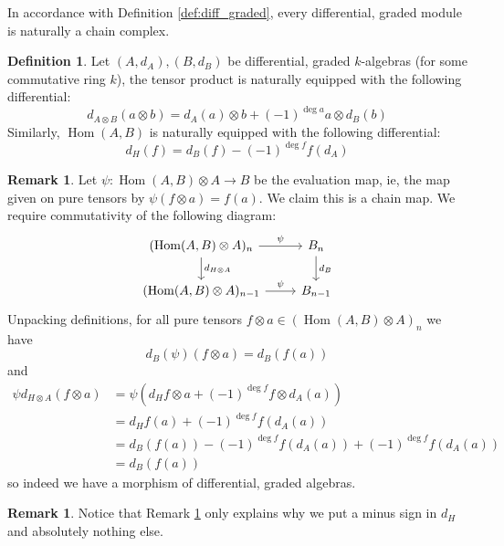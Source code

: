 \documentclass[12pt]{article}
\theoremstyle{plain}
\theoremstyle{definition}
\newtheorem{defn}[thm]{Definition} %
\newtheorem{remark}[thm]{Remark}
\newcommand{\lto}{\longrightarrow}
\begin{document}
In accordance with Definition \ref{def:diff_graded}, every differential, graded module is naturally a chain complex.
\begin{defn}
Let $(A,d_A),(B,d_B)$ be differential, graded $k$-algebras (for some commutative ring $k$), the tensor product is naturally equipped with the following differential:
\begin{equation}
d_{A \otimes B}(a \otimes b) = d_A(a) \otimes b + (-1)^{\operatorname{deg}a}a \otimes d_B(b)
\end{equation}
Similarly, $\operatorname{Hom}(A,B)$ is naturally equipped with the following differential:
\begin{equation}
d_{H}(f)= d_B(f) - (-1)^{\operatorname{deg}f}f(d_A)
\end{equation}



\end{defn}
\begin{remark}\label{rmk:useless}
Let $\psi: \operatorname{Hom}(A,B) \otimes A \lto B$ be the evaluation map, ie, the map given on pure tensors by $\psi(f\otimes a) = f(a)$. We claim this is a chain map. We require commutativity of the following diagram:
\begin{equation}
\begin{tikzcd}
(\operatorname{Hom}(A,B) \otimes A)_n\arrow[r,"{\psi}"]\arrow[d,"{d_{H\otimes A}}"] & B_n\arrow[d,"{d_B}"]\\
(\operatorname{Hom}(A,B) \otimes A)_{n-1}\arrow[r,"{\psi}"] & B_{n-1}
\end{tikzcd}
\end{equation}
Unpacking definitions, for all pure tensors $f \otimes a \in (\operatorname{Hom}(A,B) \otimes A)_n$ we have
\begin{equation}
d_B(\psi)(f \otimes a) = d_B(f(a))
\end{equation}
and
\begin{align*}
\psi d_{H\otimes A}(f\otimes a) &= \psi (d_Hf \otimes a + (-1)^{\operatorname{deg}f}f \otimes d_A(a))\\
&= d_Hf(a) + (-1)^{\operatorname{deg}f}f(d_A(a))\\
&= d_B(f(a)) - (-1)^{\operatorname{deg}f}f(d_A(a)) + (-1)^{\operatorname{deg}f}f(d_A(a))\\
&= d_B(f(a))
\end{align*}
so indeed we have a morphism of differential, graded algebras.
\end{remark}
\begin{remark}
Notice that Remark \ref{rmk:useless} only explains why we put a minus sign in $d_H$ and absolutely nothing else.
\end{remark}
\end{document}
